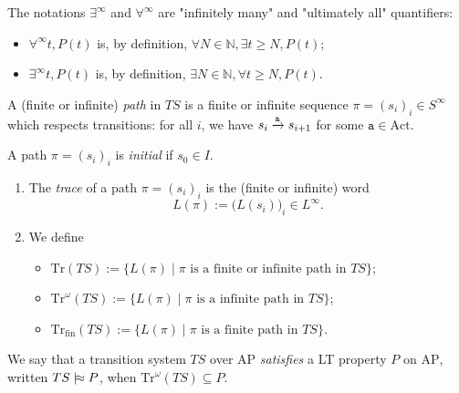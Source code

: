 \documentclass[./main]{subfiles}
\begin{document}
  \begin{rmk}
    The notations $\exists^\infty$ and $\forall^\infty$ are "infinitely many" and "ultimately all" quantifiers:
    \begin{itemize}
      \item $\forall^\infty t, P(t)$ is, by definition, $\forall N \in \mathds{N}, \exists t \ge N, P(t)$;
      \item $\exists^\infty t, P(t)$ is, by definition, $\exists N \in \mathds{N}, \forall t \ge N, P(t)$.
    \end{itemize}
  \end{rmk}

  \begin{defn}
    A (finite or infinite) \textit{path} in $TS$ is a finite or infinite sequence $\pi = (s_i)_{i} \in S^\infty$ which respects transitions: for all $i$, we have $s_i \mathrel{\xrightarrow{\mathtt{a}}} s_{i+1}$ for some $\mathtt{a} \in \mathrm{Act}$.

    A path $\pi = (s_i)_i$ is \textit{initial} if $s_0 \in I$.
  \end{defn}

  \begin{defn}[Trace]
    \begin{enumerate}
      \item The \textit{trace} of a path $\pi = (s_i)_i$ is the (finite or infinite) word 
        \[
        L(\pi) := \big(L(s_i)\big)_i \in L^\infty
        .\]
      \item We define
        \begin{itemize}
          \item $\mathrm{Tr}(TS) := \{L(\pi)  \mid \pi \text{ is a finite or infinite path in } TS\}$;
          \item $\mathrm{Tr}^\omega(TS) := \{L(\pi)  \mid \pi \text{ is a infinite path in } TS\}$;
          \item $\mathrm{Tr}_\mathrm{fin}(TS) := \{L(\pi)  \mid \pi \text{ is a finite path in } TS\}$.
        \end{itemize}
    \end{enumerate}
  \end{defn}

  \begin{defn}
    We say that a transition system $TS$ over $\mathrm{AP}$ \textit{satisfies} a LT property $P$ on $\mathrm{AP}$, written $TS \mathrel{{|}\!{\approx}} P$, when $\mathrm{Tr}^\omega(TS) \subseteq P$.
  \end{defn}
\end{document}

